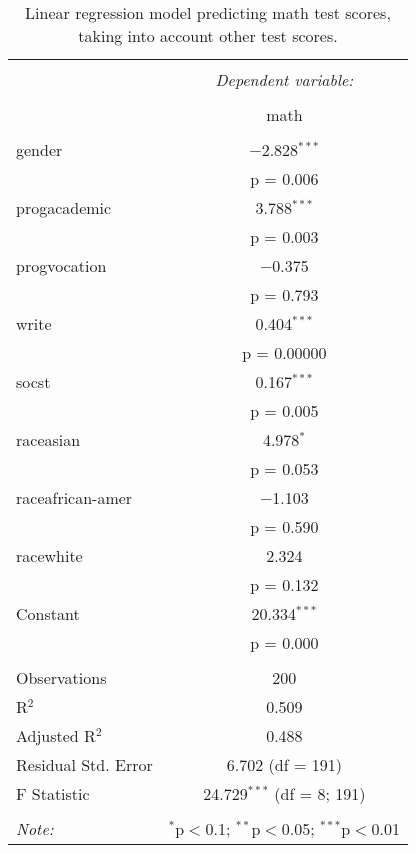 
\begin{table}[!htbp] \centering 
  \caption{Linear regression model predicting math test scores, taking into 
          account other test scores.} 
  \label{tab::lm_math_peeking} 
\begin{tabular}{@{\extracolsep{5pt}}lc} 
\\[-1.8ex]\hline 
\hline \\[-1.8ex] 
 & \multicolumn{1}{c}{\textit{Dependent variable:}} \\ 
\cline{2-2} 
\\[-1.8ex] & math \\ 
\hline \\[-1.8ex] 
 gender & $-$2.828$^{***}$ \\ 
  & p = 0.006 \\ 
  progacademic & 3.788$^{***}$ \\ 
  & p = 0.003 \\ 
  progvocation & $-$0.375 \\ 
  & p = 0.793 \\ 
  write & 0.404$^{***}$ \\ 
  & p = 0.00000 \\ 
  socst & 0.167$^{***}$ \\ 
  & p = 0.005 \\ 
  raceasian & 4.978$^{*}$ \\ 
  & p = 0.053 \\ 
  raceafrican-amer & $-$1.103 \\ 
  & p = 0.590 \\ 
  racewhite & 2.324 \\ 
  & p = 0.132 \\ 
  Constant & 20.334$^{***}$ \\ 
  & p = 0.000 \\ 
 \hline \\[-1.8ex] 
Observations & 200 \\ 
R$^{2}$ & 0.509 \\ 
Adjusted R$^{2}$ & 0.488 \\ 
Residual Std. Error & 6.702 (df = 191) \\ 
F Statistic & 24.729$^{***}$ (df = 8; 191) \\ 
\hline 
\hline \\[-1.8ex] 
\textit{Note:}  & \multicolumn{1}{r}{$^{*}$p$<$0.1; $^{**}$p$<$0.05; $^{***}$p$<$0.01} \\ 
\end{tabular} 
\end{table} 

